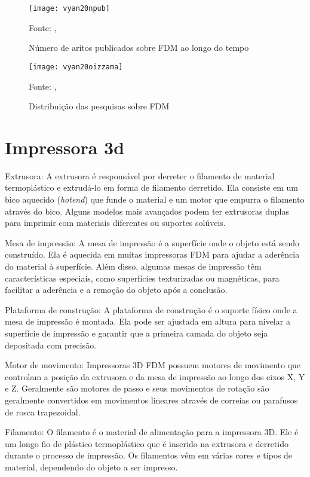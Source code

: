 \begin{figure}[!htb]
    \centering
    \caption{Número de aritos publicados sobre FDM ao longo do tempo}
    \texttt{[image: vyan20npub]}
    
    {\footnotesize Fonte: \citeauthor{vyavahare20}, \citeyear{vyavahare20}}
    \label{fig:numero_artigos}
\end{figure}

\begin{figure}[!htb]
    \centering
    \caption{Distribuição das pesquisas sobre FDM}
    \texttt{[image: vyan20oizzama]}

    {\footnotesize Fonte: \citeauthor{vyavahare20}, \citeyear{vyavahare20}}
    \label{fig:distr_artigos}
\end{figure}


\section{Impressora 3d}

Extrusora: A extrusora é responsável por derreter o filamento de material termoplástico e extrudá-lo 
em forma de filamento derretido. 
Ela consiste em um bico aquecido (\textit{hotend}) que funde o material e um motor que empurra o 
filamento através do bico. Alguns modelos mais avançados podem ter extrusoras duplas para 
imprimir com materiais diferentes ou suportes solúveis.

Mesa de impressão: A mesa de impressão é a superfície onde o objeto está sendo construído. 
Ela é aquecida em muitas impressoras FDM para ajudar a aderência do material à superfície. 
Além disso, algumas mesas de impressão têm características especiais, como superfícies 
texturizadas ou magnéticas, para facilitar a aderência e a remoção do objeto após a conclusão.

Plataforma de construção: A plataforma de construção é o suporte físico onde a mesa de impressão é montada. 
Ela pode ser ajustada em altura para nivelar a superfície de impressão e garantir que a primeira camada do 
objeto seja depositada com precisão.

Motor de movimento: Impressoras 3D FDM possuem motores de movimento que controlam a posição da extrusora e 
da mesa de impressão ao longo dos eixos X, Y e Z. Geralmente são motores de passo e seus movimentos de rotação
são geralmente convertidos em movimentos lineares através de correias ou parafusos de rosca trapezoidal.

Filamento: O filamento é o material de alimentação para a impressora 3D. Ele é um longo fio de plástico 
termoplástico que é inserido na extrusora e derretido durante o processo de impressão. Os filamentos vêm 
em várias cores e tipos de material, dependendo do objeto a ser impresso.

